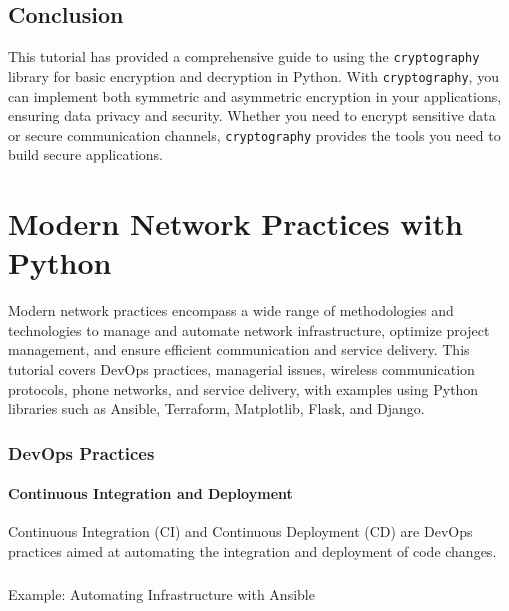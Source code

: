 \documentclass[
  letterpaper,
  DIV=11,
  numbers=noendperiod]{scrreprt}
\makeatletter
\let\oldparagraph\paragraph
\renewcommand{\paragraph}{
    \@ifstar
      \xxxParagraphStar
      \xxxParagraphNoStar
  }
\newcommand{\xxxParagraphStar}[1]{\oldparagraph*{#1}\mbox{}}
\newcommand{\xxxParagraphNoStar}[1]{\oldparagraph{#1}\mbox{}}
\makeatother
\begin{document}
\section{Conclusion}\label{conclusion-49}

This tutorial has provided a comprehensive guide to using the
\texttt{cryptography} library for basic encryption and decryption in
Python. With \texttt{cryptography}, you can implement both symmetric and
asymmetric encryption in your applications, ensuring data privacy and
security. Whether you need to encrypt sensitive data or secure
communication channels, \texttt{cryptography} provides the tools you
need to build secure applications.


\chapter{Modern Network Practices with
Python}\label{modern-network-practices-with-python}

Modern network practices encompass a wide range of methodologies and
technologies to manage and automate network infrastructure, optimize
project management, and ensure efficient communication and service
delivery. This tutorial covers DevOps practices, managerial issues,
wireless communication protocols, phone networks, and service delivery,
with examples using Python libraries such as Ansible, Terraform,
Matplotlib, Flask, and Django.

\subsection{DevOps Practices}\label{devops-practices}

\subsubsection{Continuous Integration and
Deployment}\label{continuous-integration-and-deployment}

Continuous Integration (CI) and Continuous Deployment (CD) are DevOps
practices aimed at automating the integration and deployment of code
changes.

\paragraph{Example: Automating Infrastructure with
Ansible}\label{example-automating-infrastructure-with-ansible}
\end{document}
